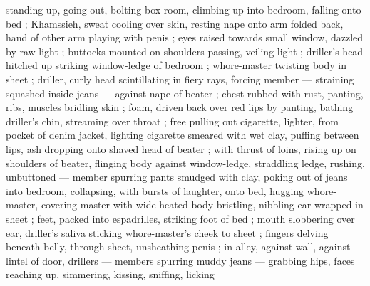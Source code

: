 standing up, going out, bolting box-room, climbing up into bedroom, 
falling onto bed ; Khamssieh, sweat cooling over skin, resting nape 
onto arm folded back, hand of other arm playing with penis ; eyes 
raised towards small window, dazzled by raw light ; buttocks mounted 
on shoulders passing, veiling light ; driller's head hitched up striking 
window-ledge of bedroom ; whore-master twisting body in sheet ; 
driller, curly head scintillating in fiery rays, forcing member --- 
straining squashed inside jeans --- against nape of beater ; chest 
rubbed with rust, panting, ribs, muscles bridling skin ; foam, driven 
back over red lips by panting, bathing driller's chin, streaming over 
throat ; free pulling out cigarette, lighter, from pocket of denim 
jacket, lighting cigarette smeared with wet clay, puffing between lips, 
ash dropping onto shaved head of beater ; with thrust of loins, rising 
up on shoulders of beater, flinging body against window-ledge, 
straddling ledge, rushing, unbuttoned --- member spurring pants 
smudged with clay, poking out of jeans {\dashcom} into bedroom, collapsing, 
with bursts of laughter, onto bed, hugging whore-master, covering 
master with wide heated body bristling, nibbling ear wrapped in sheet 
; feet, packed into espadrilles, striking foot of bed ; mouth 
slobbering over ear, driller's saliva sticking whore-master's cheek to 
sheet ; fingers delving beneath belly, through sheet, unsheathing 
penis  ; in alley, against wall, 
against lintel of door, drillers --- members spurring muddy jeans --- 
grabbing hips, faces reaching up, simmering, kissing, sniffing, licking 
